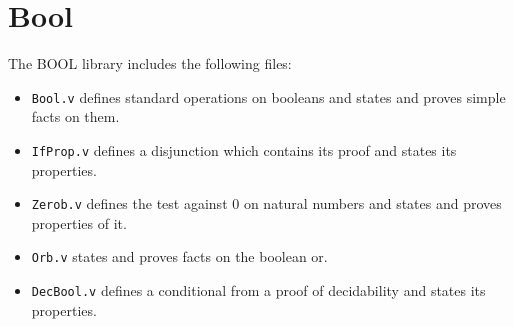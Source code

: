 \section{Bool}\label{Bool}

The BOOL library includes the following files:

\begin{itemize}

\item {\tt Bool.v} defines standard operations on booleans and states
  and proves simple facts on them.
\item {\tt IfProp.v} defines a disjunction which contains its proof
  and states its properties.
\item {\tt Zerob.v} defines the test against 0 on natural numbers and
  states and proves properties of it.
\item {\tt Orb.v} states and proves facts on the boolean or.
\item {\tt DecBool.v} defines a conditional from a proof of
  decidability and states its properties.
\end{itemize}
